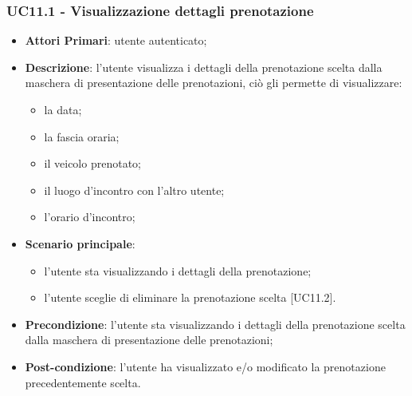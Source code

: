  \subsubsection{UC11.1 - Visualizzazione dettagli prenotazione}
\begin{itemize}
	\item \textbf{Attori Primari}: utente autenticato;
	\item \textbf{Descrizione}: l'utente visualizza i dettagli della prenotazione scelta dalla maschera di presentazione delle prenotazioni, ciò gli permette di visualizzare:
	\begin{itemize}
		\item la data;
		\item la fascia oraria;
		\item il veicolo prenotato;
		\item il luogo d'incontro con l'altro utente;
		\item l'orario d'incontro;
	\end{itemize}
	\item \textbf{Scenario principale}:
	\begin{itemize}
		\item l'utente sta visualizzando i dettagli della prenotazione;
		\item l'utente sceglie di eliminare la prenotazione scelta [UC11.2].
	\end{itemize}
	\item \textbf{Precondizione}: l'utente sta visualizzando i dettagli della prenotazione scelta dalla maschera di presentazione delle prenotazioni;
	\item \textbf{Post-condizione}: l'utente ha visualizzato e/o modificato la prenotazione precedentemente scelta.
\end{itemize}
\begin{comment}

\subsubsection{UC6.2 - Modifica di una prenotazione}
\begin{itemize}
	\item \textbf{Attori Primari}: utente autenticato;
	\item \textbf{Descrizione}: l'utente modifica uno o più dati della prenotazione selezionata;
	\item \textbf{Scenario principale}: l'utente si trova all'interno della pagina di modifica della prenotazione precedentemente selezionata;
	\item \textbf{Precondizione}: l'utente si trova nella pagina di presentazione di tutte le sue prenotazioni e ne ha selezionato una per la modifica, oppure l'utente si trova nella pagina di visualizzazione dettagli prenotazione e sceglie di modificare quest'ultima;
	\item \textbf{Post-condizione}: l'utente ha modificato uno o più dati della prenotazione selezionata.
\end{itemize}

\end{comment}
